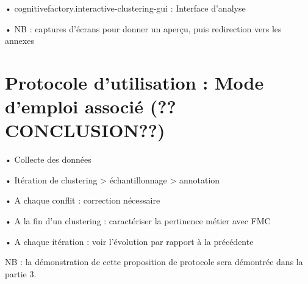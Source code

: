         •	cognitivefactory.interactive-clustering-gui : Interface d’analyse

        •	NB : captures d’écrans pour donner un aperçu, puis redirection vers les annexes
    
    \section{Protocole d’utilisation : Mode d'emploi associé (??CONCLUSION??)}

        •	Collecte des données

        •	Itération de clustering > échantillonnage > annotation

        •	A chaque conflit : correction nécessaire

        •	A la fin d’un clustering : caractériser la pertinence métier avec FMC

        •	A chaque itération : voir l’évolution par rapport à la précédente

        NB : la démonstration de cette proposition de protocole sera démontrée dans la partie 3.